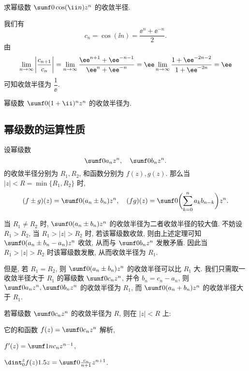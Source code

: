 \begin{example}
  求幂级数 $\sumf0 \cos(\ii n)z^n$ 的收敛半径.
\end{example}

\begin{solution}
  我们有
  \[
    c_n=\cos(\ii n)=\dfrac{\ee^n+\ee^{-n}}2.
  \]
  由
  \[
     \lim_{n\ra\infty}\abs{\frac{c_{n+1}}{c_n}}
    =\lim_{n\ra\infty}\frac{\ee^{n+1}+\ee^{-n-1}}{\ee^n+\ee^{-n}}
    =\ee\lim_{n\ra\infty}\frac{1+\ee^{-2n-2}}{1+\ee^{-2n}}
    =\ee
  \]
  可知收敛半径为 $\dfrac1\ee$.
\end{solution}

\begin{exercise}
  幂级数 $\sumf0 (1+\ii)^nz^n$ 的收敛半径为\fillblank[2cm]{}.
\end{exercise}


\subsection{幂级数的运算性质}

\begin{theorem}
  设幂级数
  \[
    \sumf0 a_nz^n,\quad
    \sumf0 b_nz^n.
  \]
  的收敛半径分别为 $R_1,R_2$, 和函数分别为 $f(z),g(z)$.
  那么当 $|z|<R=\min\{R_1,R_2\}$ 时,
  \[
    (f\pm g)(z)=\sumf0 (a_n\pm b_n)z^n,\quad
    (fg)(z)=\sumf0 \biggl(\sum_{k=0}^na_kb_{n-k}\biggr)z^n.
  \]
\end{theorem}

当 $R_1\neq R_2$ 时, $\sumf0 (a_n\pm b_n)z^n$ 的收敛半径为二者收敛半径的较大值.
不妨设 $R_1>R_2$, 当 $R_1>|z|>R_2$ 时, 若该幂级数收敛, 则由上述定理可知 $\sumf0 (a_n\pm b_n-a_n)z^n$ 收敛, 从而与 $\sumf0 b_nz^n$ 发散矛盾.
因此当 $R_1>|z|>R_2$ 时该幂级数发散, 从而收敛半径为 $R_1$.

但是, 若 $R_1=R_2$, 则 $\sumf0 (a_n\pm b_n)z^n$ 的收敛半径可以比 $R_1$ 大. 我们只需取一收敛半径大于 $R_1$ 的幂级数 $\sumf0 c_nz^n$, 并令 $b_n=c_n-a_n$, 则 $\sumf0 a_nz^n,\sumf0 b_nz^n$ 的收敛半径为 $R_1$, 而 $\sumf0 (a_n+b_n)z^n$ 的收敛半径大于 $R_1$.

\begin{theorem}
  若幂级数 $\sumf0 c_nz^n$ 的收敛半径为 $R$, 则在 $|z|<R$ 上:
  \begin{enumpar}
    \item 它的和函数 $f(z)=\sumf0 c_nz^n$ 解析,
    \item $f'(z)=\sumf1 nc_nz^{n-1}$,
    \item $\dint_0^zf(z)\d z=\sumf0 \frac{c_n}{n+1}z^{n+1}$.
  \end{enumpar}
\end{theorem}


